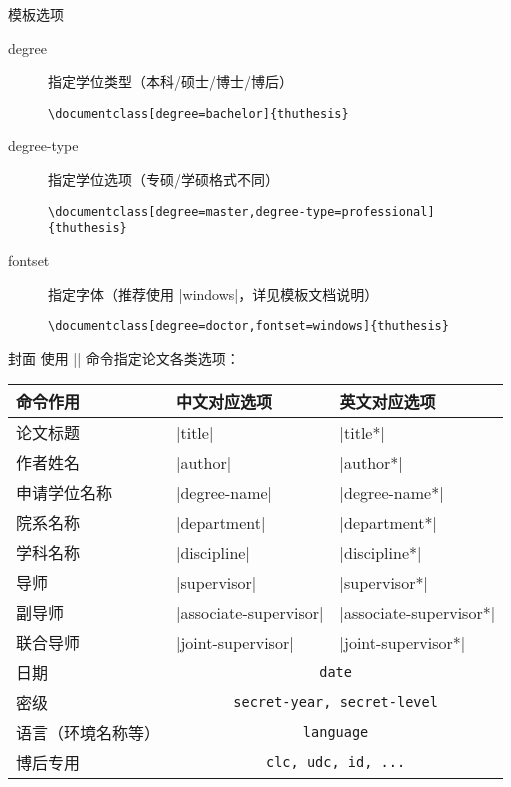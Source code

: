 \begin{frame}[fragile]{模板选项}
\begin{description}
\item[degree] 指定学位类型（本科/硕士/博士/博后）
  \begin{lstlisting}[basicstyle=\ttfamily]
\documentclass[degree=bachelor]{thuthesis}
  \end{lstlisting}
\item[degree-type] 指定学位选项（专硕/学硕格式不同）
  \begin{lstlisting}[basicstyle=\ttfamily]
\documentclass[degree=master,degree-type=professional]{thuthesis}
  \end{lstlisting}
\item[fontset] 指定字体（推荐使用 |windows|，详见模板文档说明）
  \begin{lstlisting}[basicstyle=\ttfamily]
\documentclass[degree=doctor,fontset=windows]{thuthesis}
  \end{lstlisting}
\end{description}
\end{frame}

\begin{frame}[fragile]{封面}
  使用 |\thusetup| 命令指定论文各类选项：
  \begin{table}[h]
    \centering
\footnotesize
  \begin{tabular}{lll} \toprule
    命令作用 & 中文对应选项 & 英文对应选项 \\ \midrule
  论文标题 & |title| & |title*| \\
  作者姓名&  |author| &|author*|\\
  申请学位名称 & |degree-name|&|degree-name*|\\
  院系名称 & |department| & |department*|\\
  学科名称 & |discipline| & |discipline*|\\
  导师 & |supervisor| & |supervisor*|\\
  副导师 & |associate-supervisor| & |associate-supervisor*|\\
  联合导师 & |joint-supervisor| & |joint-supervisor*|\\
  日期 & \multicolumn{2}{c}{\texttt{date}}\\
  密级 & \multicolumn{2}{c}{\texttt{secret-year, secret-level}}\\
  语言（环境名称等） & \multicolumn{2}{c}{\texttt{language}} \\ 
  博后专用 & \multicolumn{2}{c}{\texttt{clc, udc, id, ...}} \\ \bottomrule
  \end{tabular}
  \end{table}
\end{frame}

